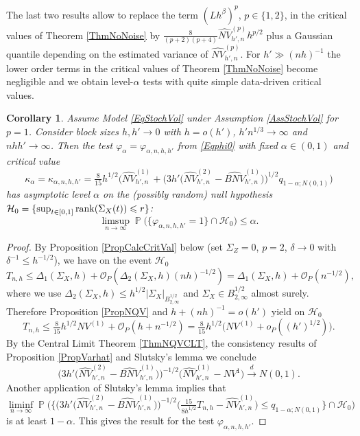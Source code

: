 \documentclass[preprint,aos]{imsart}
\numberwithin{equation}{section}
\newtheorem{corollary}[satz]{Corollary}
\theoremstyle{remark}
\DeclareMathOperator{\PP}{{\mathbb P}}
\renewcommand{\phi}{\varphi}
\providecommand{\abs}[1]{\lvert #1 \rvert}
\renewcommand{\le}{\leqslant}
\begin{document}
The last two results allow to replace the term $(Lh^\beta)^p$, $p\in\{1,2\}$, in the critical values of Theorem \ref{ThmNoNoise} by $\tfrac {8}{(p+2)(p+4)}\widehat{NV}^{(p)}_{h',n}h^{p/2}$ plus a Gaussian quantile depending on the estimated variance of $\widehat{NV}^{(p)}_{h',n}$. For $h'\gg (nh)^{-1}$ the lower order terms in the critical values of Theorem \ref{ThmNoNoise} become negligible and we obtain level-$\alpha$ tests with quite simple data-driven critical values.

\begin{corollary}\label{Corkappahat1}
Assume Model \eqref{EqStochVol} under Assumption \ref{AssStochVol} for $p=1$. Consider block sizes $h,h'\to 0$ with $h=o(h')$, $h'n^{1/3}\to\infty$ and $nhh'\to\infty$.
Then the test $\phi_\alpha=\phi_{\alpha,n,h,h'}$ from \eqref{Eqphi0} with fixed $\alpha\in(0,1)$ and critical value
\[ \kappa_\alpha=\kappa_{\alpha,n,h,h'}=\tfrac {8}{15}h^{1/2}\Big(\widehat{NV}_{h',n}^{(1)}+ \Big(3h'\big(\widehat{NV}_{h',n}^{(2)}-\widehat{BNV}_{h',n}^{(1)}\big)\Big)^{1/2}q_{1-\alpha;N(0,1)}\Big)\]
has asymptotic level $\alpha$ on the (possibly random) null hypothesis ${\mathcal H}_0=\{\sup_{t\in[0,1]}\rank(\Sigma_X(t))\le r\}$:
\[ \limsup_{n\to\infty}\PP\Big(\{\phi_{\alpha,n,h,h'}=1\}\cap{\mathcal H}_0\Big)\le\alpha.\]
\end{corollary}

\begin{proof}
By Proposition \ref{PropCalcCritVal} below (set $\Sigma_Z=0$, $p=2$, $\delta\to 0$ with $\delta^{-1}\le h^{-1/2}$), we have on the event ${\mathcal H_0}$
\[ T_{n,h}\le \Delta_1(\Sigma_X,h)+{\mathcal O}_P(\Delta_2(\Sigma_X,h)(nh)^{-1/2})=\Delta_1(\Sigma_X,h)+{\mathcal O}_P(n^{-1/2}),\]
where we use $\Delta_2(\Sigma_X,h)\le h^{1/2}\abs{\Sigma_X}_{B^{1/2}_{2,\infty}}$ and $\Sigma_X\in B^{1/2}_{2,\infty}$ almost surely. Therefore Proposition \ref{PropNQV} and $h+(nh)^{-1}=o(h')$ yield on ${\mathcal H}_0$
\[ T_{n,h}\le \tfrac{8}{15}h^{1/2}NV^{(1)}+{\mathcal O}_P(h+n^{-1/2})= \tfrac{8}{15}h^{1/2}\big(NV^{(1)}+{ o}_P((h')^{1/2})\big).\]
By the Central Limit Theorem \ref{ThmNQVCLT}, the consistency results of Proposition \ref{PropVarhat} and Slutsky's lemma we conclude
\[ \Big(3h' \big(\widehat{NV}_{h',n}^{(2)}-\widehat{BNV}^{(1)}_{h',n}\big)\Big)^{-1/2}\Big(\widehat{NV}^{(1)}_{h',n}-NV^1\Big) \xrightarrow{d} N(0,1).
\]
Another application of Slutsky's lemma implies that
\[ \liminf_{n\to\infty}\PP\Big(\Big\{\Big(3h' \big(\widehat{NV}_{h',n}^{(2)}-\widehat{BNV}^{(1)}_{h',n}\big)\Big)^{-1/2}\Big(\tfrac{15}{8h^{1/2}}T_{n,h}-\widehat{NV}^{(1)}_{h',n}\Big)\le q_{1-\alpha;N(0,1)}\Big\}\cap{\mathcal H}_0\Big)\]
is at least $1-\alpha$. This gives the result for the test $\phi_{\alpha,n,h,h'}$.
\end{proof}
\end{document}
